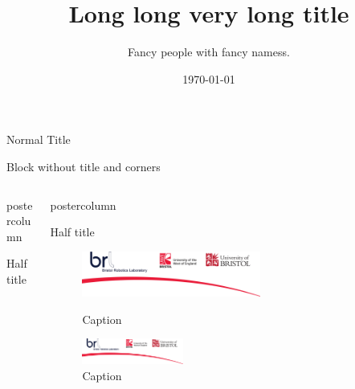 \documentclass{beamer}
\title{Long long very long title}
\author{Fancy people with fancy namess.}
\institute{Fancy institutions with fancy names.}
\date{\today}
\begin{document}
\begin{frame}
	
\begin{BRLblock}{Normal Title}
\blindmathtrue \blindtext
\end{BRLblock}

\vspace{0.8cm}
\begin{BRLblock}[colframe=white,no shadow]{}
	Block without title and corners
\end{BRLblock}	
\vspace{3.0cm}

\begin{columns}[t]
	\begin{column}{.49\textwidth}
		\begin{beamercolorbox}[center,wd=\textwidth]{postercolumn}
			\begin{BRLblock}[equal height group=A]{Half title}
				\blindtext
			\end{BRLblock}\vfill
	\end{beamercolorbox}
	\end{column}
	\hspace{15pt}
	\begin{column}{.49\textwidth}
		\begin{beamercolorbox}[center,wd=\textwidth]{postercolumn}
			\begin{BRLblock}[equal height group=A]{Half title}
				\blindtext
				\begin{figure}
					\begin{minipage}{0.43\textwidth}
						\centering\includegraphics[width=0.6\textwidth]{BRL}
						\caption{Caption}
					\end{minipage}
					\begin{minipage}{0.03\textwidth}
					\end{minipage}
					\begin{minipage}{0.45\textwidth}
						\centering\includegraphics[width=0.34\textwidth]{BRL}
						\caption{Caption}
					\end{minipage}
				\end{figure}
			\end{BRLblock}
		\end{beamercolorbox}
	\end{column}
\end{columns}


\end{frame}
\end{document}
